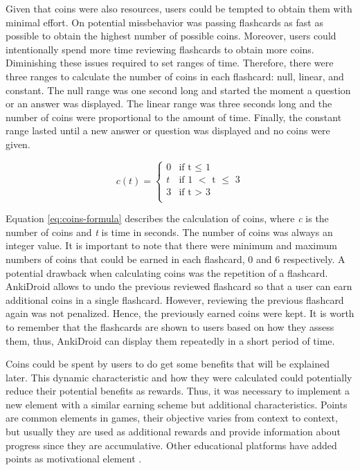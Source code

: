 Given that coins were also resources, users could be tempted to obtain them with minimal effort. On potential missbehavior was passing flashcards as fast as possible to obtain the highest number of possible coins. Moreover, users could intentionally spend more time reviewing flashcards to obtain more coins. Diminishing these issues required to set ranges of time. Therefore, there were three ranges to calculate the number of coins in each flashcard: null, linear, and constant. The null range was one second long and started the moment a question or an answer was displayed. The linear range was three seconds long and the number of coins were proportional to the amount of time. Finally, the constant range lasted until a new answer or question was displayed and no coins were given.

\begin{equation}
  c(t) =
      \begin{cases}
        0 & \text{if t $\leq$ 1}\\
        t & \text{if 1 $<$ t $\leq$ 3}\\
        3 & \text{if t $>$ 3}\\
      \end{cases}
    \label{eq:coins-formula}
\end{equation}

Equation \ref{eq:coins-formula} describes the calculation of coins, where \textit{c} is the number of coins and \textit{t} is time in seconds. The number of coins was always an integer value. It is important to note that there were minimum and maximum numbers of coins that could be earned in each flashcard, 0 and 6 respectively. A potential drawback when calculating coins was the repetition of a flashcard. AnkiDroid allows to undo the previous reviewed flashcard so that a user can earn additional coins in a single flashcard. However, reviewing the previous flashcard again was not penalized. Hence, the previously earned coins were kept. It is worth to remember that the flashcards are shown to users based on how they assess them, thus, AnkiDroid can display them repeatedly in a short period of time.

Coins could be spent by users to do get some benefits that will be explained later. This dynamic characteristic and how they were calculated could potentially reduce their potential benefits as rewards. Thus, it was necessary to implement a new element with a similar earning scheme but additional characteristics. Points are common elements in games, their objective varies from context to context, but usually they are used as additional rewards and provide information about progress since they are accumulative. Other educational platforms have added points as motivational element \citep{disalvo2014khan}.

